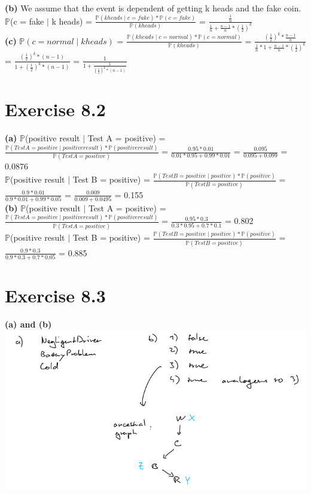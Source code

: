 \documentclass[12pt]{article}
\begin{document}
\textbf{(b)} We assume that the event is dependent of getting k heads and the fake coin.\\
$\mathbb{P}$(c = fake $\mid$ k heads) = $\frac{\mathbb{P}(k heads \mid c = fake) * \mathbb{P}(c = fake)}{\mathbb{P}(k heads)}$ = $\frac{\frac{1}{n}}{\frac{1}{n} + \frac{n-1}{n} * (\frac{1}{2})^{k}}$\\
\textbf{(c)} $\mathbb{P}(c = normal \mid k heads)$ = $\frac{\mathbb{P}(k heads \mid c = normal) * \mathbb{P}(c = normal)}{\mathbb{P}(k heads)}$ = $\frac{(\frac{1}{2})^{k} * \frac{n-1}{n}}{\frac{1}{n} * 1 + \frac{n-1}{n} * (\frac{1}{2})^{k}}$ = $\frac{(\frac{1}{2})^{k} * (n-1)}{1+(\frac{1}{2})^{k}*(n-1)}$ = $\frac{1}{1+\frac{1}{(\frac{1}{2})^{k}*(n-1)}}$

\section*{Exercise 8.2}

\textbf{(a)} $\mathbb{P}$(positive result $\mid$ Test A = positive) = $\frac{\mathbb{P}(Test A = positive  \mid positive result) * \mathbb{P}(positive result)}{\mathbb{P}(Test A = positive)}$ = $\frac{0.95*0.01}{0.01*0.95 + 0.99*0.01}$ = $\frac{0.095}{0.095+0.099}$ = 0.0876\\
$\mathbb{P}$(positive result $\mid$ Test B = positive) = $\frac{\mathbb{P}(Test B = positive \mid positive)* \mathbb{P}(positive)}{\mathbb{P}(Test B = positive)}$ = $\frac{0.9*0.01}{0.9*0.01+0.99*0.05}$ = $\frac{0.009}{0.009+0.0495}$ = 0.155\\
\textbf{(b)} $\mathbb{P}$(positive result $\mid$ Test A = positive) = $\frac{\mathbb{P}(Test A = positive  \mid positive result) * \mathbb{P}(positive result)}{\mathbb{P}(Test A = positive)}$ = $\frac{0.95*0.3}{0.3*0.95 + 0.7*0.1}$ = 0.802\\
$\mathbb{P}$(positive result $\mid$ Test B = positive) = $\frac{\mathbb{P}(Test B = positive \mid positive)* \mathbb{P}(positive)}{\mathbb{P}(Test B = positive)}$ = $\frac{0.9*0.3}{0.9*0.3+0.7*0.05}$ = 0.885\\

\section*{Exercise 8.3}


\textbf{(a) and (b)}\\

\includegraphics[width=\textwidth]{figures/8.3ab.png}
\end{document}
